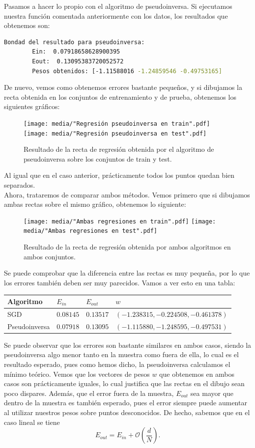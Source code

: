 \documentclass[12pt]{scrartcl}
\begin{document}
{Pasamos a hacer lo propio con el algoritmo de pseudoinversa. Si ejecutamos nuestra función comentada anteriormente con los datos, los resultados que obtenemos son:
\begin{lstlisting}[language=bash]
Bondad del resultado para pseudoinversa:
        Ein:  0.07918658628900395
        Eout:  0.13095383720052572
        Pesos obtenidos: [-1.11588016 -1.24859546 -0.49753165]
\end{lstlisting}
De nuevo, vemos como obtenemos errores bastante pequeños, y si dibujamos la recta obtenida en los conjuntos de entrenamiento y de prueba, obtenemos los siguientes gráficos:
\begin{figure}[H]
  \centering
  \texttt{[image: media/"Regresión pseudoinversa en train".pdf]}
  \texttt{[image: media/"Regresión pseudoinversa en test".pdf]}
  \caption{Resultado de la recta de regresión obtenida por el algoritmo de pseudoinversa sobre los conjuntos de train y test.}
\end{figure}
Al igual que en el caso anterior, prácticamente todos los puntos quedan bien separados.\\

Ahora, trataremos de comparar ambos métodos. Vemos primero que si dibujamos ambas rectas sobre el mismo gráfico, obtenemos lo siguiente:
\begin{figure}[H]
  \centering
  \texttt{[image: media/"Ambas regresiones en train".pdf]}
  \texttt{[image: media/"Ambas regresiones en test".pdf]}
  \caption{Resultado de la recta de regresión obtenida por ambos algoritmos en ambos conjuntos.}
\end{figure}

Se puede comprobar que la diferencia entre las rectas es muy pequeña, por lo que los errores también deben ser muy parecidos. Vamos a ver esto en una tabla:


\begin{table}[H]
  \centering
  \begin{tabular}{llll}
  \hline
  Algoritmo     & $E_{in}$    & $E_{out}$  & $w$ \\ \hline
  SGD           & $0.08145$ & $0.13517$ &  $(-1.238315, -0.224508, -0.461378)$ \\
  Pseudoinversa & $0.07918$ & $0.13095$ & $(-1.115880, -1.248595, -0.497531)$
  \end{tabular}
  \end{table}
Se puede observar que los errores son bastante similares en ambos casos, siendo la pseudoinversa algo menor tanto en la muestra como fuera de ella, lo cual es el resultado esperado, pues como hemos dicho, la pseudoinversa calculamos
el mínimo teórico. Vemos que los vectores de pesos $w$ que obtenemos en ambos casos son prácticamente iguales, lo cual justifica que las rectas en el dibujo sean poco dispares. Además, que el error fuera de la muestra, $E_{out}$ sea mayor que dentro de la muestra es también esperado, 
pues el error siempre puede aumentar al utilizar nuestros pesos sobre puntos desconocidos. De hecho, sabemos que en el caso lineal se tiene
$$
E_{out} = E_{in} + \mathcal O\left( \frac{d}{N}\right).
$$

}
\end{document}
